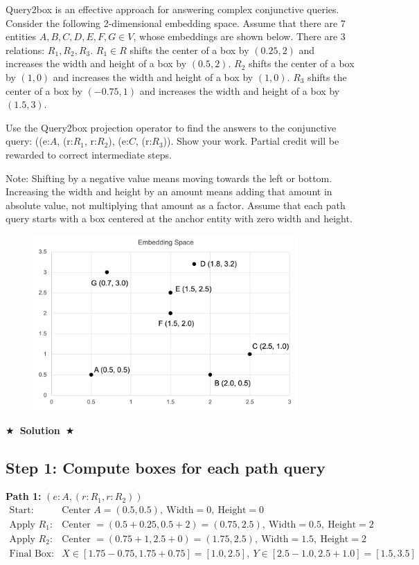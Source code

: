 \documentclass[11pt]{article}
\numberwithin{figure}{section}
\newcommand{\Solution}[1]{{\medskip \color{red} \bf $\bigstar$~\sf \textbf{Solution}~$\bigstar$ \sf #1 } \bigskip}
\begin{document}
Query2box is an effective approach for answering complex conjunctive queries. Consider the following 2-dimensional embedding space. Assume that there are 7 entities $A, B, C, D, E, F, G \in V$, whose embeddings are shown below. There are 3 relations: $R_1, R_2, R_3$. $R_1 \in R$ shifts the center of a box by $(0.25, 2)$ and increases the width and height of a box by $(0.5, 2)$. $R_2$ shifts the center of a box by $(1, 0)$ and increases the width and height of a box by $(1, 0)$. $R_3$ shifts the center of a box by $(-0.75, 1)$ and increases the width and height of a box by $(1.5, 3)$.

Use the Query2box projection operator to find the answers to the conjunctive query: ((e:$A$, (r:$R_1$, r:$R_2$), (e:$C$, (r:$R_3$)). Show your work. Partial credit will be rewarded to correct intermediate steps.

Note: Shifting by a negative value means moving towards the left or bottom. Increasing the width and height by an amount means adding that amount in absolute value, not multiplying that amount as a factor. Assume that each path query starts with a box centered at the anchor entity with zero width and height.

\begin{figure}[H]
    \centering
    \includegraphics[width=0.9\textwidth]{CS224W_Homework2/5.4.png}
    \label{fig:5.4}
\end{figure}

\Solution{}

\subsection*{Step 1: Compute boxes for each path query}

\textbf{Path 1: }$(e:A, (r:R_1, r:R_2))$  
\begin{align*}
\text{Start: } & \text{Center } A = (0.5, 0.5),\ \text{Width}=0,\ \text{Height}=0 \\
\text{Apply } R_1: & \text{Center } = (0.5+0.25, 0.5+2) = (0.75, 2.5),\ \text{Width}=0.5,\ \text{Height}=2 \\
\text{Apply } R_2: & \text{Center } = (0.75+1, 2.5+0) = (1.75, 2.5),\ \text{Width}=1.5,\ \text{Height}=2 \\
\text{Final Box: } & X \in [1.75 - 0.75, 1.75 + 0.75] = [1.0, 2.5],\ Y \in [2.5 - 1.0, 2.5 + 1.0] = [1.5, 3.5]
\end{align*}
\end{document}
